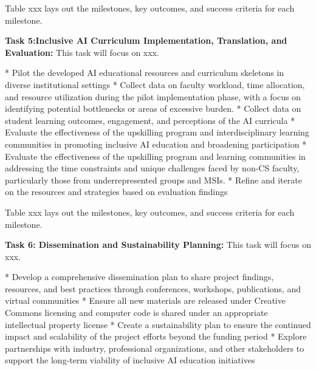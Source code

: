\documentclass[11pt]{article}
\begin{document}
Table xxx lays out the milestones, key outcomes, and success criteria for each milestone. 

\begin{tcolorbox}[colback=mycmykcolor, colframe=black, boxrule=1pt, coltext=black]
\textbf{Task 5:Inclusive AI Curriculum Implementation, Translation, and Evaluation:} This task will focus on xxx.
\end{tcolorbox}

* Pilot the developed AI educational resources and curriculum skeletons in diverse institutional settings
* Collect data on faculty workload, time allocation, and resource utilization during the pilot implementation phase, with a focus on identifying potential bottlenecks or areas of excessive burden.
* Collect data on student learning outcomes, engagement, and perceptions of the AI curricula
* Evaluate the effectiveness of the upskilling program and interdisciplinary learning communities in promoting inclusive AI education and broadening participation
* Evaluate the effectiveness of the upskilling program and learning communities in addressing the time constraints and unique challenges faced by non-CS faculty, particularly those from underrepresented groups and MSIs.
* Refine and iterate on the resources and strategies based on evaluation findings


Table xxx lays out the milestones, key outcomes, and success criteria for each milestone. 

\begin{tcolorbox}[colback=mycmykcolor, colframe=black, boxrule=1pt, coltext=black]
\textbf{Task 6: Dissemination and Sustainability Planning:} This task will focus on xxx.
\end{tcolorbox}

* Develop a comprehensive dissemination plan to share project findings, resources, and best practices through conferences, workshops, publications, and virtual communities
* Ensure all new materials are released under Creative Commons licensing and computer code is shared under an appropriate intellectual property license
* Create a sustainability plan to ensure the continued impact and scalability of the project efforts beyond the funding period
* Explore partnerships with industry, professional organizations, and other stakeholders to support the long-term viability of inclusive AI education initiatives
\end{document}

